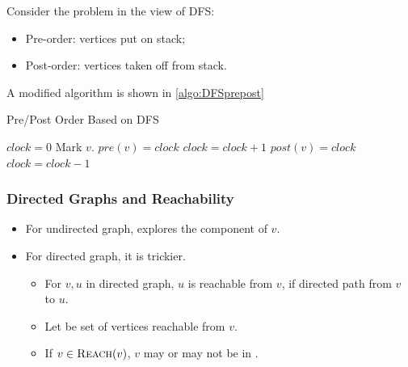 Consider the problem in the view of DFS:
\begin{itemize}
    \item Pre-order: vertices put on stack;
    \item Post-order: vertices taken off from stack.
\end{itemize}

A modified algorithm is shown in \cref{algo:DFSprepost}
\begin{algorithm}[H]
    \caption{Pre/Post Order Based on DFS}\label{algo:DFSprepost}
    \begin{algorithmic}[1]
            \State $clock = 0$
                    \State{}
                \EndIf
            \EndFor
        \EndProcedure
            \State Mark $v$.
            \State {}
                    \State{}
                \EndIf
            \EndFor
            \State{}
        \EndProcedure
            \State $pre(v) = clock$
            \State $clock = clock + 1$
        \EndProcedure
            \State $post(v) = clock$
            \State $clock = clock - 1$
        \EndProcedure
    \end{algorithmic}
\end{algorithm}

\subsubsection{Directed Graphs and Reachability}
\begin{itemize}
    \item For undirected graph,  explores the component of $v$.
    \item For directed graph, it is trickier.
        \begin{itemize}
            \item For $v,u$ in directed graph, $u$ is reachable from $v$,
                if directed path from $v$ to $u$.
            \item Let  be set of vertices
                reachable from $v$.
            \item If $v \in \textsc{Reach} (v)$, $v$ may or may not be in
                .
        \end{itemize}
\end{itemize}


